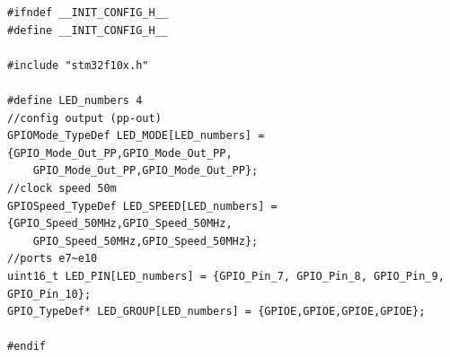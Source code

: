 \documentclass{ctexart}
\begin{document}
\begin{lstlisting}[caption={Header file},label={mainh}]
#ifndef __INIT_CONFIG_H__
#define __INIT_CONFIG_H__

#include "stm32f10x.h"

#define LED_numbers 4
//config output (pp-out)
GPIOMode_TypeDef LED_MODE[LED_numbers] = {GPIO_Mode_Out_PP,GPIO_Mode_Out_PP,
	GPIO_Mode_Out_PP,GPIO_Mode_Out_PP};
//clock speed 50m
GPIOSpeed_TypeDef LED_SPEED[LED_numbers] = {GPIO_Speed_50MHz,GPIO_Speed_50MHz,
	GPIO_Speed_50MHz,GPIO_Speed_50MHz};
//ports e7~e10
uint16_t LED_PIN[LED_numbers] = {GPIO_Pin_7, GPIO_Pin_8, GPIO_Pin_9, GPIO_Pin_10};
GPIO_TypeDef* LED_GROUP[LED_numbers] = {GPIOE,GPIOE,GPIOE,GPIOE};

#endif
\end{lstlisting}
\end{document}
